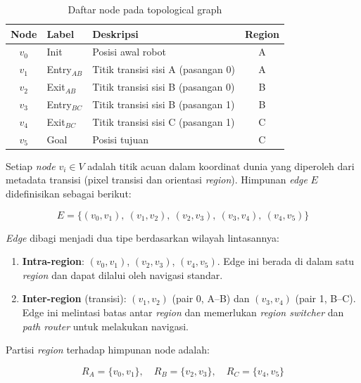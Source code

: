 \begin{table}[H]
\centering
\caption{Daftar node pada topological graph}
\label{tab:topologi_node}
\begin{tabular}{cllc}
\toprule
\textbf{Node} & \textbf{Label} & \textbf{Deskripsi} & \textbf{Region} \\
\midrule
$v_0$ & Init    & Posisi awal robot               & A \\
$v_1$ & Entry$_{AB}$ & Titik transisi sisi A (pasangan 0) & A \\
$v_2$ & Exit$_{AB}$  & Titik transisi sisi B (pasangan 0) & B \\
$v_3$ & Entry$_{BC}$ & Titik transisi sisi B (pasangan 1) & B \\
$v_4$ & Exit$_{BC}$  & Titik transisi sisi C (pasangan 1) & C \\
$v_5$ & Goal    & Posisi tujuan                    & C \\
\bottomrule
\end{tabular}
\end{table}

Setiap \emph{node} $v_i \in V$ adalah titik acuan dalam koordinat dunia
yang diperoleh dari metadata transisi (pixel transisi dan orientasi
\emph{region}). Himpunan \emph{edge} $E$ didefinisikan sebagai berikut:

\begin{equation}
E = \{ (v_0, v_1),\ (v_1, v_2),\ (v_2, v_3),\ (v_3, v_4),\ (v_4, v_5) \}
\end{equation}

\emph{Edge} dibagi menjadi dua tipe berdasarkan wilayah lintasannya:

\begin{enumerate}[nosep]
    \item \textbf{Intra-region}: $(v_0, v_1)$, $(v_2, v_3)$, $(v_4, v_5)$.
    Edge ini berada di dalam satu \emph{region} dan dapat dilalui oleh
    navigasi standar.
    \item \textbf{Inter-region} (transisi): $(v_1, v_2)$ (pair 0, A--B)
    dan $(v_3, v_4)$ (pair 1, B--C). Edge ini melintasi batas antar
    \emph{region} dan memerlukan \emph{region switcher} dan \emph{path router} untuk melakukan navigasi.
\end{enumerate}

Partisi \emph{region} terhadap himpunan node adalah:

\begin{equation}
R_A = \{v_0, v_1\},\quad
R_B = \{v_2, v_3\},\quad
R_C = \{v_4, v_5\}
\end{equation}


